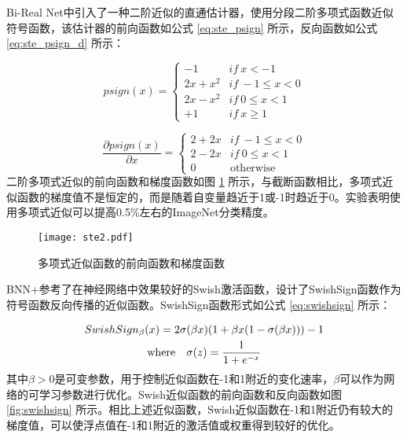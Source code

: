 Bi-Real Net\cite{birealnet}中引入了一种二阶近似的直通估计器，使用分段二阶多项式函数近似符号函数，该估计器的前向函数如公式 \eqref{eq:ste_psign} 所示，反向函数如公式 \eqref{eq:ste_psign_d} 所示：

\begin{equation}
  \label{eq:ste_psign}
  psign(x) = 
  \begin{cases}
    -1 & if \ x < - 1 \\
    2x + x^2 & if \ - 1 \leq x < 0 \\
    2x - x^2 & if \ 0 \leq x < 1 \\
    +1 & if \ x \geq 1
  \end{cases}
\end{equation}

\begin{equation}
  \label{eq:ste_psign_d}
  \frac{\partial psign(x)}{\partial x} = 
  \begin{cases}
    2 + 2x & if \ - 1 \leq x < 0 \\
    2 - 2x & if \ 0 \leq x < 1 \\
    0 & \text{otherwise}
  \end{cases}
\end{equation}
二阶多项式近似的前向函数和梯度函数如图 \ref{fig:ste_psign} 所示，与截断函数相比，多项式近似函数的梯度值不是恒定的，而是随着自变量趋近于1或-1时趋近于0。实验表明使用多项式近似可以提高0.5\%左右的ImageNet分类精度。

\begin{figure}[htb]
  \centering
  \texttt{[image: ste2.pdf]}
  \caption{多项式近似函数的前向函数和梯度函数}
  \label{fig:ste_psign}
\end{figure}

BNN+\cite{bnn+}参考了在神经网络中效果较好的Swish激活函数，设计了SwishSign函数作为符号函数反向传播的近似函数。SwishSign函数形式如公式 \eqref{eq:swishsign} 所示：

\begin{gather}
  \label{eq:swishsign}
  SwishSign_{\beta}(x) = 2\sigma(\beta x)(1 + \beta x(1 - \sigma(\beta x))) -1 \\
  \text{where} \quad \sigma (z) = \frac{1}{1 + e^{-x}} \notag
\end{gather}
其中$\beta > 0$是可变参数，用于控制近似函数在-1和1附近的变化速率，$\beta$可以作为网络的可学习参数进行优化。Swish近似函数的前向函数和反向函数如图 \ref{fig:swishsign} 所示。相比上述近似函数，Swish近似函数在-1和1附近仍有较大的梯度值，可以使浮点值在-1和1附近的激活值或权重得到较好的优化。

